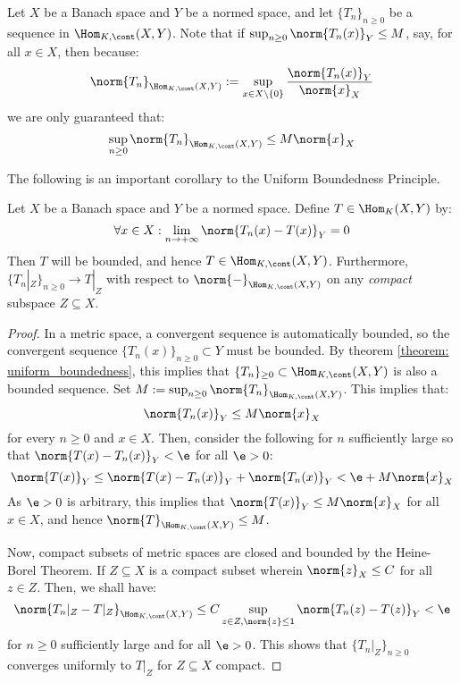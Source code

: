         \begin{remark}
            Let $X$ be a Banach space and $Y$ be a normed space, and let $\{T_n\}_{n \geq 0}$ be a sequence in $\Hom_{K, \cont}(X, Y)$. Note that if $\sup_{n \geq 0} \norm{ T_n(x) }_Y \leq M$, say, for all $x \in X$, then because:
                $$\norm{T_n}_{\Hom_{K, \cont}(X, Y)} := \sup_{x \in X \setminus \{0\}} \frac{ \norm{T_n(x)}_Y }{ \norm{x}_X }$$
            we are only guaranteed that:
                $$\sup_{n \geq 0} \norm{T_n}_{\Hom_{K, \cont}(X, Y)} \leq M \norm{x}_X$$
        \end{remark}
        The following is an important corollary to the Uniform Boundedness Principle.
        \begin{corollary} \label{coro: compact_limits_of_pointwise_convergent_sequences_of_continuous_linear_maps}
            Let $X$ be a Banach space and $Y$ be a normed space. Define $T \in \Hom_K(X, Y)$ by:
                $$\forall x \in X: \lim_{n \to +\infty} \norm{T_n(x) - T(x)}_Y = 0$$
            Then $T$ will be bounded, and hence $T \in \Hom_{K, \cont}(X, Y)$. Furthermore, $\{T_n|_Z\}_{n \geq 0} \to T|_Z$ with respect to $\norm{-}_{\Hom_{K, \cont}(X, Y)}$ on any \textit{compact} subspace $Z \subseteq X$.
        \end{corollary}
            \begin{proof}
                In a metric space, a convergent sequence is automatically bounded, so the convergent sequence $\{T_n(x)\}_{n \geq 0} \subset Y$ must be bounded. By theorem \ref{theorem: uniform_boundedness}, this implies that $\{T_n\}_{\geq 0} \subset \Hom_{K, \cont}(X, Y)$ is also a bounded sequence. Set $M := \sup_{n \geq 0} \norm{T_n}_{\Hom_{K, \cont}(X, Y)}$. This implies that:
                    $$\norm{T_n(x)}_Y \leq M \norm{x}_X$$
                for every $n \geq 0$ and $x \in X$. Then, consider the following for $n$ sufficiently large so that $\norm{T(x) - T_n(x)}_Y < \e$ for all $\e > 0$:
                    $$\norm{T(x)}_Y \leq \norm{T(x) - T_n(x)}_Y + \norm{T_n(x)}_Y < \e + M \norm{x}_X$$
                As $\e > 0$ is arbitrary, this implies that $\norm{T(x)}_Y \leq M \norm{x}_X$ for all $x \in X$, and hence $\norm{T}_{\Hom_{K, \cont}(X, Y)} \leq M$.

                Now, compact subsets of metric spaces are closed and bounded by the Heine-Borel Theorem. If $Z \subseteq X$ is a compact subset wherein $\norm{z}_X \leq C$ for all $z \in Z$. Then, we shall have:
                    $$\norm{T_n|_Z - T|_Z}_{\Hom_{K, \cont}(X, Y)} \leq C \sup_{z \in Z, \norm{z} \leq 1} \norm{ T_n(z) - T(z) }_Y < \e$$
                for $n \geq 0$ sufficiently large and for all $\e > 0$. This shows that $\{T_n|_Z\}_{n \geq 0}$ converges uniformly to $T|_Z$ for $Z \subseteq X$ compact.
            \end{proof}
